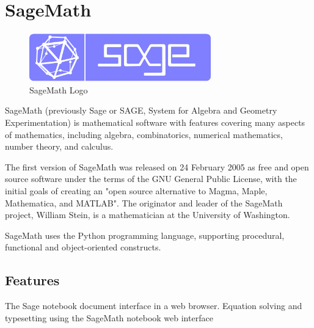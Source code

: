 \section{SageMath}

\begin{figure}[!ht]
\centering
\includegraphics[width=0.7\textwidth]{images/sage.png}                   
\caption{SageMath Logo}
\hspace{-1.5em}
\end{figure}

SageMath (previously Sage or SAGE, System for Algebra and Geometry Experimentation) is mathematical software with features covering many aspects of mathematics, including algebra, combinatorics, numerical mathematics, number theory, and calculus.


The first version of SageMath was released on 24 February 2005 as free and open source software under the terms of the GNU General Public License, with the initial goals of creating an "open source alternative to Magma, Maple, Mathematica, and MATLAB". The originator and leader of the SageMath project, William Stein, is a mathematician at the University of Washington.


SageMath uses the Python programming language, supporting procedural, functional and object-oriented constructs.


\subsection{Features}
The Sage notebook document interface in a web browser.
Equation solving and typesetting using the SageMath notebook web interface


